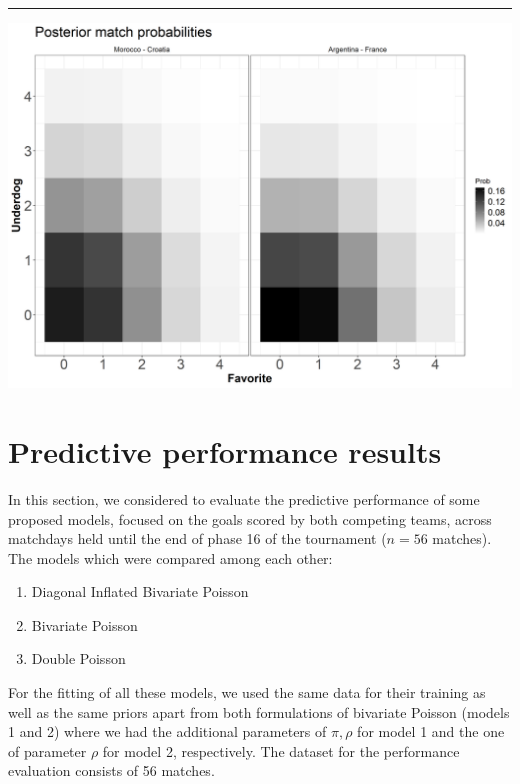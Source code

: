 \documentclass[
  10pt,
]{article}
\begin{document}
\begin{center}\rule{0.5\linewidth}{0.5pt}\end{center}

\begin{center}\includegraphics[width=0.8\linewidth]{figs/data2-1} \end{center}


\section{Predictive performance results}

In this section, we considered to evaluate the predictive performance of some proposed models, focused on the goals scored by both competing teams, across matchdays held until the end of phase 16 of the tournament ($n=56$ matches). The models which were compared among each other:

\begin{enumerate}
\item Diagonal Inflated Bivariate Poisson
\item Bivariate Poisson
\item Double Poisson
\end{enumerate}

For the fitting of all these models, we used the same data for their training as well as the same priors apart from both formulations of bivariate Poisson (models 1 and 2) where we had the additional parameters of $\pi, \rho$ for model 1 and the one of parameter $\rho$ for model 2, respectively. The dataset for the performance evaluation consists of 56 matches.
\end{document}
